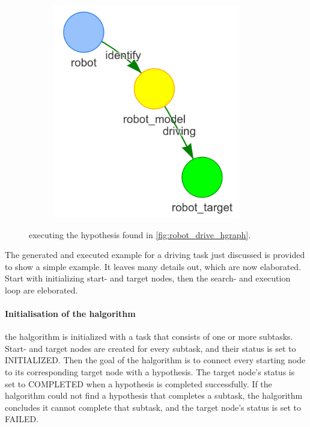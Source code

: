 \begin{figure}[h]
\begin{subfigure}{.3\textwidth}
    \end{subfigure}
    \begin{subfigure}{.3\textwidth}
    \centering
    \includegraphics[width=0.9\textwidth]{figures/proposed_method/connecting_nodes/robot_to_target/execute_robot_to_target_3}
    \end{subfigure}
    \caption{executing the hypothesis found in \cref{fig:robot_drive_hgraph}.}
    \label{fig:execute_robot_to_target}
\end{figure}

The generated and executed example for a driving task just discussed is provided to show a simple example. It leaves many details out, which are now elaborated. Start with initializing start- and target nodes, then the search- and execution loop are eleborated.\bs

\paragraph{Initialisation of the \ac{halgorithm}}
the \ac{halgorithm} is initialized with a task that consists of one or more subtasks. Start- and target nodes are created for every subtask, and their status is set to INITIALIZED. Then the goal of the \ac{halgorithm} is to connect every starting node to its corresponding target node with a hypothesis. The target node's status is set to COMPLETED when a hypothesis is completed successfully. If the \ac{halgorithm} could not find a hypothesis that completes a subtask, the \ac{halgorithm} concludes it cannot complete that subtask, and the target node's status is set to FAILED.\bs


